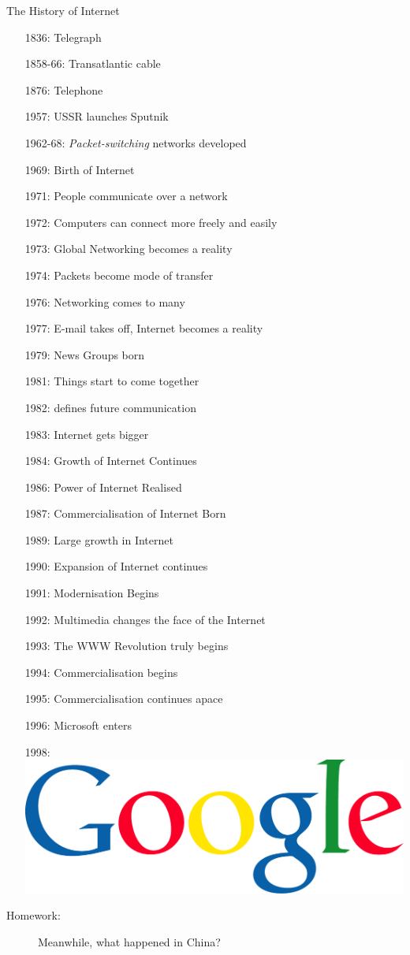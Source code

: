 \begin{frame}[allowframebreaks=.8]{The History of Internet}
  \begin{itemize}
  \item[1836:] Telegraph
  \item[1858-66:] Transatlantic cable
  \item[1876:] Telephone
  \item[1957:] USSR launches Sputnik
  \item[1962-68:] \emph{Packet-switching} networks developed
  \item[1969:] Birth of Internet
  \item[1971:] People communicate over a network
  \item[1972:] Computers can connect more freely and easily
  \item[1973:] Global Networking becomes a reality
  \item[1974:] Packets become mode of transfer
  \item[1976:] Networking comes to many
  \item[1977:] E-mail takes off, Internet becomes a reality
  \item[1979:] News Groups born
  \item[1981:] Things start to come together
  \item[1982:] \emph{\tcpip{}} defines future communication
  \item[1983:] Internet gets bigger
  \item[1984:] Growth of Internet Continues
  \item[1986:] Power of Internet Realised
  \item[1987:] Commercialisation of Internet Born
  \item[1989:] Large growth in Internet
  \item[1990:] Expansion of Internet continues
  \item[1991:] Modernisation Begins
  \item[1992:] Multimedia changes the face of the Internet
  \item[1993:] The WWW Revolution truly begins
  \item[1994:] Commercialisation begins
  \item[1995:] Commercialisation continues apace
  \item[1996:] Microsoft enters
  \item[1998:] \includegraphics[height=.9em]{google}
  \end{itemize}
  \begin{description}
  \item[Homework:] Meanwhile, what happened in China?
  \end{description}
\end{frame}

